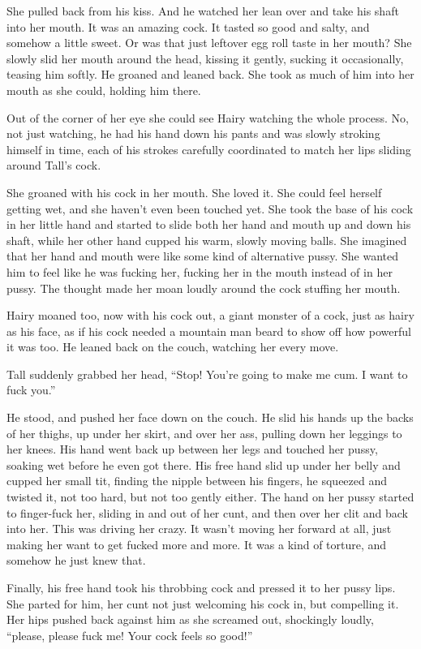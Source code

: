\documentclass[letterpaper]{article}
\begin{document}
She pulled back from his kiss.
And he watched her lean over and take his shaft into her mouth.
It was an amazing cock. It tasted so good and salty, and somehow a little sweet. Or was that just leftover egg roll taste in her mouth?
She slowly slid her mouth around the head, kissing it gently, sucking it occasionally, teasing him softly.
He groaned and leaned back.
She took as much of him into her mouth as she could, holding him there.

Out of the corner of her eye she could see Hairy watching the whole process.
No, not just watching, he had his hand down his pants and was slowly stroking himself in time, each of his strokes carefully coordinated to match her lips sliding around Tall's cock.

She groaned with his cock in her mouth. She loved it. She could feel herself getting wet, and she haven't even been touched yet. 
She took the base of his cock in her little hand and started to slide both her hand and mouth up and down his shaft, while her other hand cupped his warm, slowly moving balls. 
She imagined that her hand and mouth were like some kind of alternative pussy. 
She wanted him to feel like he was fucking her, fucking her in the mouth instead of in her pussy.
The thought made her moan loudly around the cock stuffing her mouth.

Hairy moaned too, now with his cock out, a giant monster of a cock, just as hairy as his face, as if his cock needed a mountain man beard to show off how powerful it was too. He leaned back on the couch, watching her every move.

Tall suddenly grabbed her head, ``Stop! You're going to make me cum. I want to fuck you.''

He stood, and pushed her face down on the couch.
He slid his hands up the backs of her thighs, up under her skirt, and over her ass, pulling down her leggings to her knees.
His hand went back up between her legs and touched her pussy, soaking wet before he even got there.
His free hand slid up under her belly and cupped her small tit, finding the nipple between his fingers, he squeezed and twisted it, not too hard, but not too gently either.
The hand on her pussy started to finger-fuck her, sliding in and out of her cunt, and then over her clit and back into her.
This was driving her crazy.
It wasn't moving her forward at all, just making her want to get fucked more and more. It was a kind of torture, and somehow he just knew that.

Finally, his free hand took his throbbing cock and pressed it to her pussy lips.
She parted for him, her cunt not just welcoming his cock in, but compelling it.
Her hips pushed back against him as she screamed out, shockingly loudly, ``please, please fuck me! Your cock feels so good!''
\end{document}
